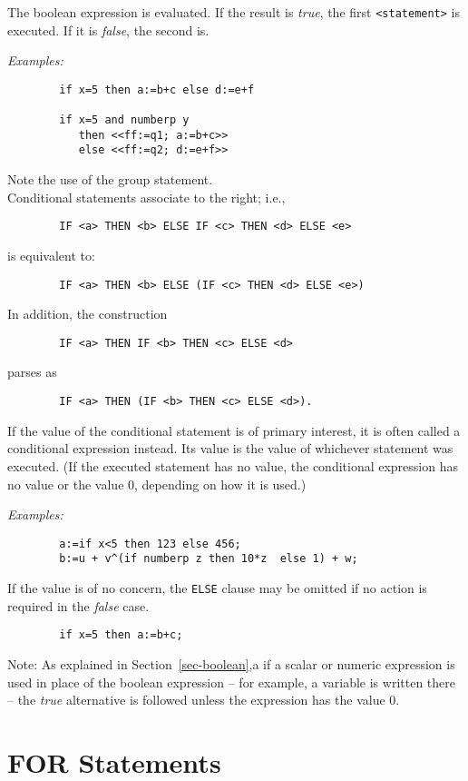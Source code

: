 The boolean expression is evaluated. If the result is {\em true}, the first
{\tt <statement>} is executed.  If it is {\em false}, the second is.

{\it Examples:}
\begin{verbatim}
        if x=5 then a:=b+c else d:=e+f

        if x=5 and numberp y
           then <<ff:=q1; a:=b+c>>
           else <<ff:=q2; d:=e+f>>
\end{verbatim}
Note the use of the group statement.
\\
Conditional statements associate to the right; i.e.,
\begin{verbatim}
        IF <a> THEN <b> ELSE IF <c> THEN <d> ELSE <e>
\end{verbatim}
is equivalent to:
\begin{verbatim}
        IF <a> THEN <b> ELSE (IF <c> THEN <d> ELSE <e>)
\end{verbatim}
In addition, the construction
\begin{verbatim}
        IF <a> THEN IF <b> THEN <c> ELSE <d>
\end{verbatim}
parses as
\begin{verbatim}
        IF <a> THEN (IF <b> THEN <c> ELSE <d>).
\end{verbatim}
If the value of the conditional statement is of primary interest, it is often called a conditional
expression instead.  Its value is the value of whichever statement was
executed. (If the executed statement has no value, the conditional
expression has no value or the value 0, depending on how it is used.)

{\it Examples:}
\begin{verbatim}
        a:=if x<5 then 123 else 456;
        b:=u + v^(if numberp z then 10*z  else 1) + w;
\end{verbatim}
If the value is of no concern, the {\tt ELSE} clause may be omitted if no
action is required in the {\em false} case.
\begin{verbatim}
        if x=5 then a:=b+c;
\end{verbatim}
Note:  As explained in Section~\ref{sec-boolean},a
if a scalar or numeric expression is used in place of
the boolean expression -- for example, a variable is written there -- the
{\em true} alternative is followed unless the expression has the value 0.

\section{FOR Statements}

